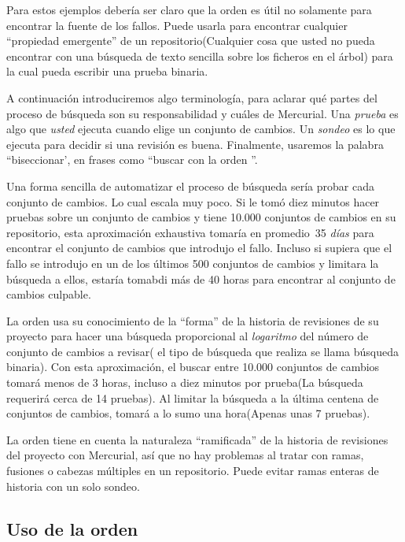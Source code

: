 Para estos ejemplos debería ser claro que la orden 
es útil no solamente para encontrar la fuente de los fallos. Puede
usarla para encontrar cualquier ``propiedad emergente'' de un
repositorio(Cualquier cosa que usted no pueda encontrar con una
búsqueda de texto sencilla sobre los ficheros en el árbol) para la
cual pueda escribir una prueba binaria.

A continuación introduciremos algo terminología, para aclarar qué
partes del proceso de búsqueda son su responsabilidad y cuáles de
Mercurial.  Una \emph{prueba} es algo que \emph{usted} ejecuta cuando
 elige un conjunto de cambios.  Un \emph{sondeo} es lo que
 ejecuta para decidir si una revisión es buena.  Finalmente,
usaremos la palabra ``biseccionar', en frases como ``buscar con la
orden ''.

Una forma sencilla de automatizar el proceso de búsqueda sería probar
cada conjunto de cambios.  Lo cual escala muy poco. Si le tomó diez
minutos hacer pruebas sobre un conjunto de cambios y tiene 10.000
conjuntos de cambios en su repositorio, esta aproximación exhaustiva
tomaría en promedio~35 \emph{días} para encontrar el conjunto de
cambios que introdujo el fallo. Incluso si supiera que el fallo se
introdujo en un de los últimos 500 conjuntos de cambios y limitara la
búsqueda a ellos, estaría tomabdi más de 40 horas para encontrar al
conjunto de cambios culpable.

La orden  usa su conocimiento de la ``forma'' de la
historia de revisiones de su proyecto para hacer una búsqueda
proporcional al \emph{logaritmo} del número de conjunto de cambios a
revisar( el tipo de búsqueda que realiza se llama búsqueda
binaria). Con esta aproximación, el buscar entre 10.000 conjuntos de
cambios tomará menos de 3 horas, incluso a diez minutos por prueba(La
búsqueda requerirá cerca de 14 pruebas). Al limitar la búsqueda a la
última centena de conjuntos de cambios, tomará a lo sumo una
hora(Apenas unas 7 pruebas).

La orden  tiene en cuenta la naturaleza ``ramificada''
de la historia de revisiones del proyecto con Mercurial, así que no
hay problemas al tratar con ramas, fusiones o cabezas múltiples en un
repositorio.  Puede evitar ramas enteras de historia con un solo
sondeo.

\subsection{Uso de la orden }

